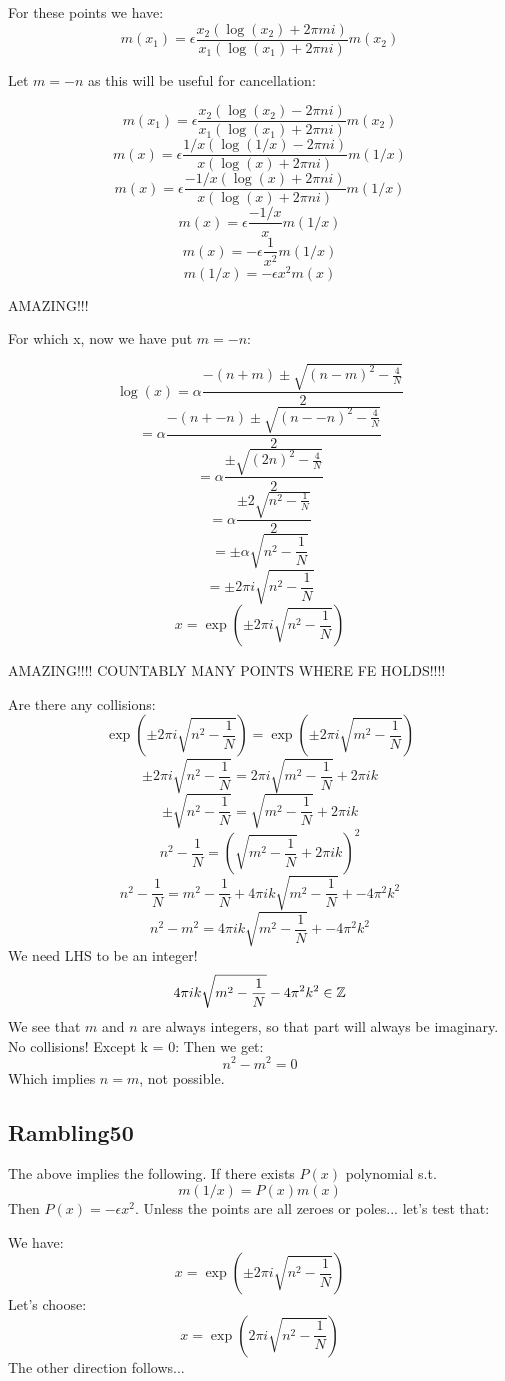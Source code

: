 \documentclass[a4paper]{amsart}
\begin{document}
For these points we have:
$$m(x_1) = \epsilon\frac{x_2(\log(x_2) + 2\pi m i)}{x_1(\log(x_1) + 2\pi n i)}m(x_2)$$


Let $m = -n$ as this will be useful for cancellation:

$$m(x_1) = \epsilon\frac{x_2(\log(x_2) - 2\pi n i)}{x_1(\log(x_1) + 2\pi n i)}m(x_2)$$
$$m(x) = \epsilon\frac{1/x(\log(1/x) - 2\pi n i)}{x(\log(x) + 2\pi n i)}m(1/x)$$
$$m(x) = \epsilon\frac{-1/x(\log(x) + 2\pi n i)}{x(\log(x) + 2\pi n i)}m(1/x)$$
$$m(x) = \epsilon\frac{-1/x}{x}m(1/x)$$
$$m(x) = -\epsilon\frac{1}{x^2}m(1/x)$$
$$m(1/x) = -\epsilon x^2m(x)$$


AMAZING!!!

For which x, now we have put $m = -n$:

$$\log(x) = \alpha\frac{-(n + m) \pm \sqrt{(n - m)^2 - \frac{4}{N}}}{2}$$
$$ = \alpha\frac{-(n + -n) \pm \sqrt{(n - -n)^2 - \frac{4}{N}}}{2}$$
$$ = \alpha\frac{\pm \sqrt{(2n)^2 - \frac{4}{N}}}{2}$$
$$ = \alpha\frac{\pm 2\sqrt{n^2 - \frac{1}{N}}}{2}$$
$$ = \pm \alpha\sqrt{n^2 - \frac{1}{N}}$$
$$ = \pm 2\pi i\sqrt{n^2 - \frac{1}{N}}$$
$$x = \exp(\pm 2\pi i\sqrt{n^2 - \frac{1}{N}})$$


AMAZING!!!! COUNTABLY MANY POINTS WHERE FE HOLDS!!!!

Are there any collisions:
$$\exp(\pm 2\pi i\sqrt{n^2 - \frac{1}{N}}) = \exp(\pm 2\pi i\sqrt{m^2 - \frac{1}{N}})$$
$$\pm 2\pi i\sqrt{n^2 - \frac{1}{N}} = 2\pi i\sqrt{m^2 - \frac{1}{N}} + 2\pi i k$$
$$\pm \sqrt{n^2 - \frac{1}{N}} = \sqrt{m^2 - \frac{1}{N}} + 2\pi i k$$
$$n^2 - \frac{1}{N} = (\sqrt{m^2 - \frac{1}{N}} + 2\pi i k)^2$$
$$n^2 - \frac{1}{N} = m^2 - \frac{1}{N} + 4\pi i k\sqrt{m^2 - \frac{1}{N}} + -4\pi^2k^2$$
$$n^2 - m^2 = 4\pi i k\sqrt{m^2 - \frac{1}{N}} + -4\pi^2k^2$$
We need LHS to be an integer!
$$4\pi i k\sqrt{m^2 - \frac{1}{N}} - 4\pi^2k^2 \in \mathbb{Z}$$
We see that $m$ and $n$ are always integers, so that part will always be imaginary. No collisions! Except k = 0: Then we get:
$$n^2 - m^2 = 0$$
Which implies $n = m$, not possible.


\subsection{Rambling50}

The above implies the following. If there exists $P(x)$ polynomial s.t.
$$m(1/x) = P(x)m(x)$$
Then $P(x) = -\epsilon x^2$. Unless the points are all zeroes or poles... let's test that: 

We have:
$$x = \exp(\pm 2\pi i\sqrt{n^2 - \frac{1}{N}})$$
Let's choose:
$$x = \exp(2\pi i\sqrt{n^2 - \frac{1}{N}})$$
The other direction follows...
\end{document}
